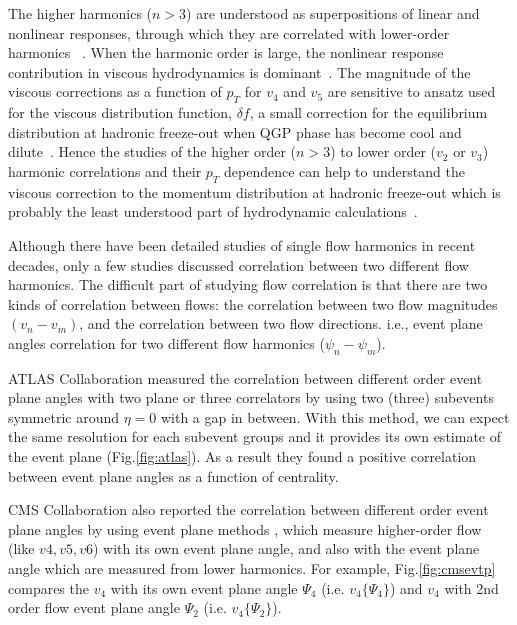 The higher harmonics ($n>3$) are understood as superpositions of linear and nonlinear responses, through which they are correlated with lower-order harmonics ~\cite{Teaney:2012ke,Bravina:2013ora}. When the harmonic order is large, the nonlinear response contribution in viscous hydrodynamics is dominant~\cite{Teaney:2012ke,Bravina:2013ora}.
The magnitude of the viscous corrections as a function of $p_T$ for $v_4$ and $v_5$ are sensitive to ansatz used for the viscous distribution function, $\delta f$, a small correction for the equilibrium distribution at hadronic freeze-out when QGP phase has become cool and dilute~\cite{Luzum:2010ad}.
Hence the studies of the higher order ($n>3$) to lower order ($v_2$ or $v_3$) harmonic correlations and their $p_T$ dependence can help to understand the viscous correction to the momentum distribution at hadronic freeze-out which is probably the least understood part of hydrodynamic calculations~\cite{Teaney:2012ke,Niemi:2015qia}.


 Although there have been detailed studies of single flow harmonics in recent decades, only a few studies discussed correlation between two different flow harmonics. The difficult part of studying flow correlation is that there are two kinds of correlation between flows: the correlation between two flow magnitudes $(v_n - v_m)$, and the correlation between two flow directions. i.e., event plane angles correlation for two different flow harmonics ($\psi_n - \psi_m$).
 
 ATLAS Collaboration measured the correlation between different order event plane angles with two plane or three correlators by using two (three) subevents symmetric around $\eta = 0$ with a gap in between. With this method, we can expect the same resolution for each subevent groups and it provides its own estimate of the event plane (Fig.\ref{fig:atlas}). As a result they found a positive correlation between event plane angles as a function of centrality.
 
 CMS Collaboration also reported the correlation between different order event plane angles by using event plane methods \cite{Chatrchyan:2013kba}, which measure higher-order flow (like $v4, v5, v6$) with its own event plane angle, and also with the event plane angle which are measured from lower harmonics. For example, Fig.\ref{fig:cmsevtp} compares the $v_4$ with its own event plane angle $\Psi_4$ (i.e. $v_4\{\Psi_4\}$) and $v_4$ with 2nd order flow event plane angle $\Psi_2$ (i.e. $v_4\{ \Psi_2 \}$). 

